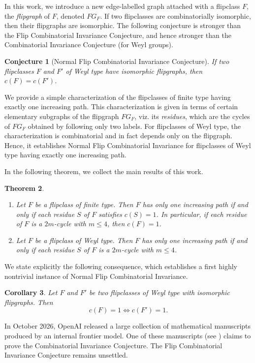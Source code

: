 \documentclass[12pt,reqno]{amsart}
\theoremstyle{plain}
\newtheorem{thm}{Theorem}[section]
\newtheorem{con}[thm]{Conjecture}
\newtheorem{cor}[thm]{Corollary}
\theoremstyle{definition}
\theoremstyle{remark}
\begin{document}
In this work, we introduce a new edge-labelled graph attached with a flipclass $F$, the \emph{flipgraph} of $F$, denoted $FG_F$. If two   flipclasses are combinatorially isomorphic, then their flipgraphs are isomorphic. 
The following conjecture is stronger than the Flip Combinatorial Invariance Conjecture, and hence stronger than the Combinatorial Invariance Conjecture (for Weyl groups). 

\begin{con}[Normal Flip Combinatorial Invariance Conjecture]
If two flipclasses $F$ and $F'$ of Weyl type  have isomorphic flipgraphs, then $c(F)=c(F')$. 
\end{con}


\bigskip
We provide a simple characterization of the flipclasses of finite type having exactly one increasing path. This characterization is given in terms of certain elementary subgraphs of the flipgraph $FG_F$, viz. its \emph{residues}, which are the cycles of $FG_F$ obtained by following only two labels.  For flipclasses of Weyl type, the characterization is combinatorial and in fact depends only on the flipgraph. Hence, it establishes Normal Flip Combinatorial Invariance for flipclasses of Weyl type having exactly one increasing path.

In the following theorem, we collect the main results of this work.
\begin{thm}
\label{collect}
$ $
\begin{enumerate}
\item Let $F$ be a flipclass of finite type. Then $F$ has only one increasing path if and only if each residue $S$ of $F$ satisfies $c(S)=1$. In particular, if each residue of $F$ is a $2m$-cycle with $m\leq 4$, then $c(F)=1$.
\item Let $F$ be a flipclass of Weyl type. Then $F$ has only one increasing path if and only if each residue $S$ of $F$ is a $2m$-cycle with $m\leq 4$.
\end{enumerate}
\end{thm}


We state explicitly the following consequence, which establishes a first highly nontrivial instance of Normal Flip Combinatorial Invariance. 
\begin{cor}
Let $F$ and $F'$ be two flipclasses of Weyl type with isomorphic flipgraphs. Then 
$$c(F)=1 \iff c(F')=1.$$
\end{cor}

\bigskip


In October 2026, OpenAI released a
large collection of mathematical manuscripts produced
by an internal frontier model.
One of these manuscripts (see \cite{O}) claims to prove
the Combinatorial Invariance Conjecture.
The Flip Combinatorial Invariance Conjecture remains unsettled.
\end{document}
